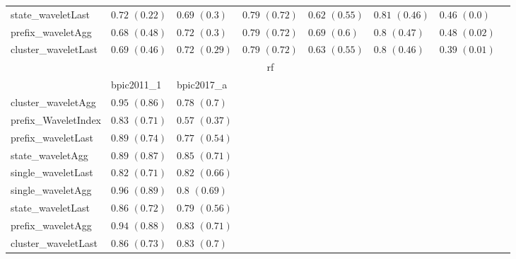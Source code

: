 \documentclass[twoside,11pt]{Latex/Classes/PhDthesisPSnPDF}
\begin{document}
\begin{table}[h]
{\begin{tabular}{llllllll}
				state\_waveletLast & $0.72$ ${(0.22)}$ & $0.69$ ${(0.3)}$ & $0.79$ ${(0.72)}$ & $0.62$ ${(0.55)}$ & $0.81$ ${(0.46)}$ & $0.46$ ${(0.0)}$ \\
				prefix\_waveletAgg & $0.68$ ${(0.48)}$ & $0.72$ ${(0.3)}$ & $0.79$ ${(0.72)}$ & $0.69$ ${(0.6)}$ & $0.8$ ${(0.47)}$ & $0.48$ ${(0.02)}$ \\
				cluster\_waveletLast & $0.69$ ${(0.46)}$ & $0.72$ ${(0.29)}$ & $0.79$ ${(0.72)}$ & $0.63$ ${(0.55)}$ & $0.8$ ${(0.46)}$ & $0.39$ ${(0.01)}$ \\
				\bottomrule
				\toprule
				& \multicolumn{5}{c}{rf}
				\\
				& bpic2011\_1 & bpic2017\_a
				\\ \midrule
				cluster\_waveletAgg & $0.95$ ${(0.86)}$ & $0.78$ ${(0.7)}$ \\
				prefix\_WaveletIndex & $0.83$ ${(0.71)}$ & $0.57$ ${(0.37)}$ \\
				prefix\_waveletLast & $0.89$ ${(0.74)}$ & $0.77$ ${(0.54)}$ \\
				state\_waveletAgg & $0.89$ ${(0.87)}$ & $\mathbf{0.85}$ $\mathbf{(0.71)}$  \\
				single\_waveletLast & $0.82$ ${(0.71)}$ & $0.82$ ${(0.66)}$ \\
				single\_waveletAgg & $\mathbf{0.96}$ $\mathbf{(0.89)}$  & $0.8$ ${(0.69)}$ \\
				state\_waveletLast & $0.86$ ${(0.72)}$ & $0.79$ ${(0.56)}$ \\
				prefix\_waveletAgg & $0.94$ ${(0.88)}$ & $0.83$ ${(0.71)}$ \\
				cluster\_waveletLast & $0.86$ ${(0.73)}$ & $0.83$ ${(0.7)}$ \\
				\bottomrule
			\end{tabular}%
	}
\end{table}


\end{document}
